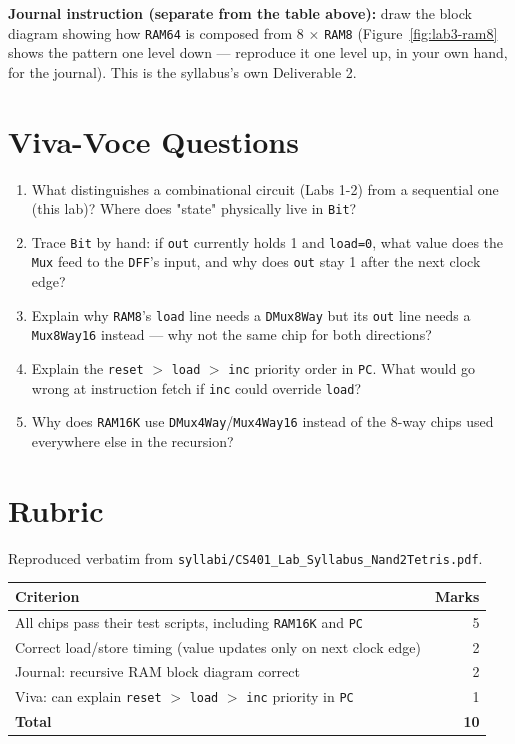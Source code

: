 \documentclass[11pt]{article}
\begin{document}
\noindent\textbf{Journal instruction (separate from the table above):} draw the block diagram showing how \texttt{RAM64} is composed from 8 $\times$ \texttt{RAM8} (Figure~\ref{fig:lab3-ram8} shows the pattern one level down --- reproduce it one level up, in your own hand, for the journal). This is the syllabus's own Deliverable 2.

\section{Viva-Voce Questions}

\begin{enumerate}
  \item What distinguishes a combinational circuit (Labs 1-2) from a sequential one (this lab)? Where does "state" physically live in \texttt{Bit}?
  \item Trace \texttt{Bit} by hand: if \texttt{out} currently holds 1 and \texttt{load=0}, what value does the \texttt{Mux} feed to the \texttt{DFF}'s input, and why does \texttt{out} stay 1 after the next clock edge?
  \item Explain why \texttt{RAM8}'s \texttt{load} line needs a \texttt{DMux8Way} but its \texttt{out} line needs a \texttt{Mux8Way16} instead --- why not the same chip for both directions?
  \item Explain the \texttt{reset} $>$ \texttt{load} $>$ \texttt{inc} priority order in \texttt{PC}. What would go wrong at instruction fetch if \texttt{inc} could override \texttt{load}?
  \item Why does \texttt{RAM16K} use \texttt{DMux4Way}/\texttt{Mux4Way16} instead of the 8-way chips used everywhere else in the recursion?
\end{enumerate}

\section{Rubric}

Reproduced verbatim from \texttt{syllabi/CS401\_Lab\_Syllabus\_Nand2Tetris.pdf}.

\begin{table}[h]
\centering
\begin{tabular}{@{}l r@{}}
\toprule
Criterion & Marks \\
\midrule
All chips pass their test scripts, including \texttt{RAM16K} and \texttt{PC} & 5 \\
Correct load/store timing (value updates only on next clock edge) & 2 \\
Journal: recursive RAM block diagram correct & 2 \\
Viva: can explain \texttt{reset} $>$ \texttt{load} $>$ \texttt{inc} priority in \texttt{PC} & 1 \\
\midrule
\textbf{Total} & \textbf{10} \\
\bottomrule
\end{tabular}
\end{table}
\end{document}

